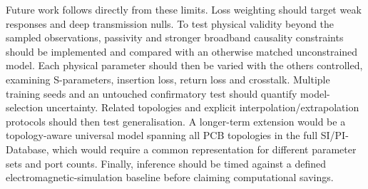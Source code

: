 Future work follows directly from these limits. Loss weighting should target
weak responses and deep transmission nulls. To test physical validity beyond
the sampled observations, passivity and stronger broadband causality constraints
should be implemented and compared with an otherwise matched unconstrained
model. Each physical parameter should then be varied with the others controlled,
examining S-parameters, insertion loss, return loss and crosstalk. Multiple
training seeds and an untouched confirmatory test should quantify
model-selection uncertainty. Related topologies and explicit
interpolation/extrapolation protocols should then test generalisation. A
longer-term extension would be a topology-aware universal model spanning all
PCB topologies in the full SI/PI-Database, which would require a common
representation for different parameter sets and port counts. Finally, inference
should be timed against a defined electromagnetic-simulation baseline before
claiming computational savings.
